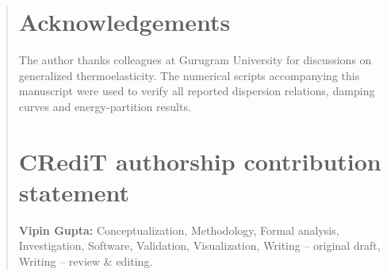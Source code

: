 \documentclass[12pt,a4paper]{article}
\begin{document}
\begin{abstract}
\newpage

\label{sec:intro_ref}
\label{sec:history_ref}
\label{sec:foundations_ref}
\label{sec:prelim_ref}
\label{sec:kinetic_ref}
\label{sec:classical_ref}
\label{sec:hyperbolic_ref}
\label{sec:lags_ref}
\label{sec:delayfid_ref}
\label{sec:memory_ref}
\label{sec:fraccoupled_ref}
\label{sec:waves3d_ref}
\label{sec:aniso_ref}
\label{sec:reflection_ref}
\label{sec:transient_ref}
\label{sec:thermalmodes_ref}
\label{sec:surface_ref}
\label{sec:lamb_ref}
\label{sec:bar_ref}
\label{sec:flexted_ref}
\label{sec:interfaces_ref}
\label{sec:size_ref}
\label{sec:multi_ref}
\label{sec:bg_ref}
\label{sec:methods_ref}
\label{sec:schemes_ref}
\label{sec:applications_ref}
\label{sec:scenarios_ref}
\label{sec:examples_ref}
\label{sec:experiments_ref}
\label{sec:synthesis_ref}
\label{sec:reporting_ref}
\label{sec:open_ref}

\section*{Acknowledgements}
The author thanks colleagues at Gurugram University for discussions on generalized thermoelasticity. The numerical scripts accompanying this manuscript were used to verify all reported dispersion relations, damping curves and energy-partition results.

\section*{CRediT authorship contribution statement}
\textbf{Vipin Gupta:} Conceptualization, Methodology, Formal analysis, Investigation, Software, Validation, Visualization, Writing -- original draft, Writing -- review \& editing.


\end{abstract}
\end{document}
